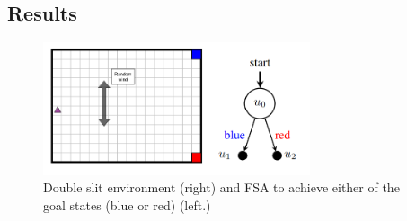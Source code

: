 \subsection{Results}

\begin{figure}[!htb]
  \centering
  \includegraphics[width=0.7\textwidth]{figures/chapter3/double_slit.png}
  \caption{Double slit environment (right) and FSA to achieve either of the goal states ({\color{blue}blue} or {\color{red}red}) (left.)}
  \label{fig:double_slit}
\end{figure}

